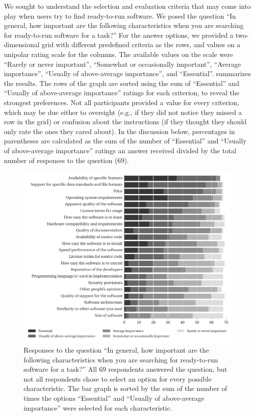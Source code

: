 \documentclass{casicswhitepaper}
\newcommand{\totalRespondents}{69\xspace}
\begin{document}
We sought to understand the selection and evaluation criteria that may come into play when users try to find ready-to-run software.  We posed the question ``In general, how important are the following characteristics when you are searching for ready-to-run software for a task?''  For the answer options, we provided a two-dimensional grid with different predefined criteria as the rows, and values on a unipolar rating scale for the columns.  The available values on the scale were ``Rarely or never important'', ``Somewhat or occasionally important'', ``Average importance'', ``Usually of above-average importance'', and ``Essential''.  summarizes the results.  The rows of the graph are sorted using the sum of ``Essential'' and ``Usually of above-average importance'' ratings for each criterion, to reveal the strongest preferences.  Not all participants provided a value for every criterion, which may be due either to oversight (e.g., if they did not notice they missed a row in the grid) or confusion about the instructions (if they thought they should only rate the ones they cared about).  In the discussion below, percentages in parentheses are calculated as the sum of the number of ``Essential'' and ``Usually of above-average importance'' ratings an answer received divided by the total number of responses to the question (\totalRespondents).

\begin{figure}[bht]
  \centering
  \hspace*{-1ex}%
  \includegraphics{files/plots/bar-graph-criteria-ready-to-run.pdf}
  \vspace*{-4ex}
  \caption{Responses to the question ``In general, how important are the following characteristics when you are searching for ready-to-run software for a task?''  All \totalRespondents respondents answered the question, but not all respondents chose to select an option for every possible characteristic.  The bar graph is sorted by the sum of the number of times the options ``Essential'' and ``Usually of above-average importance'' were selected for each characteristic.}
  \label{criteria-ready-to-run}
\end{figure}
\end{document}
